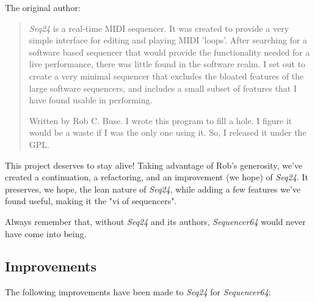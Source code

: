 \documentclass[
 11pt,
 twoside,
 a4paper,
 headinclude,
 footinclude,
 final                                 %
]{article}
\begin{document}
   The original author:

   \begin{quotation}
      \textsl{Seq24} is a real-time MIDI sequencer. It was created to
      provide a very simple interface for editing and playing MIDI 'loops'.
      After searching for a software based sequencer that would provide the
      functionality needed for a live performance, there was little found in
      the software realm. I set out to create a very minimal sequencer that
      excludes the bloated features of the large software sequencers, and
      includes a small subset of features that I have found usable in
      performing. 

      Written by Rob C. Buse.  I wrote this program to fill a
      hole.  I figure it would be a waste if I was the only one
      using it.  So, I released it under the GPL.
   \end{quotation}

   This project deserves to stay alive!  Taking advantage of Rob's generosity,
   we've created a continuation, a refactoring, and an improvement (we hope) of
   \textsl{Seq24}.  It preserves, we hope, the lean nature of \textsl{Seq24},
   while adding a few features we've found useful, making it the "vi of
   sequencers".
   
   Always remember that, without \textsl{Seq24} and its authors,
   \textsl{Sequencer64} would never have come into being.

\subsection{Improvements}
\label{subsec:improvements}

   The following improvements have been made to \textsl{Seq24} for
   \textsl{Sequencer64}:
\end{document}

